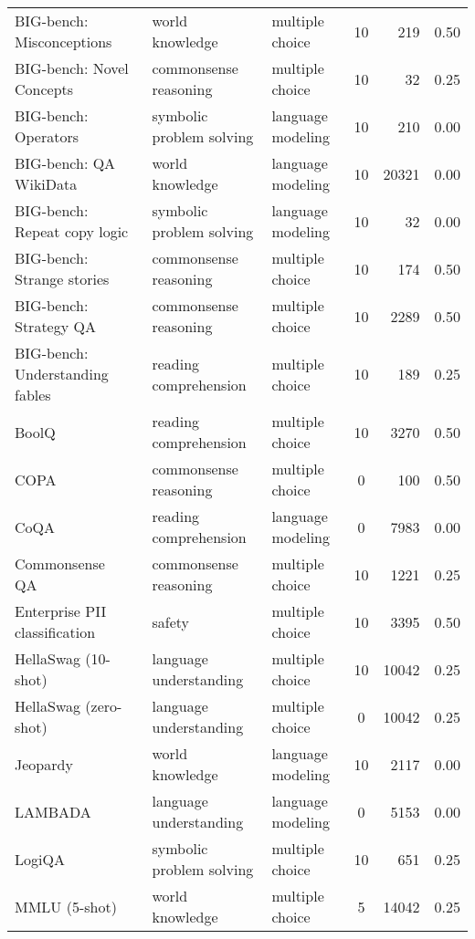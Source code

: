 \begin{table}[t!]
\begin{tabular}{lllcrc}
BIG-bench: Misconceptions~\cite{srivastava2023beyond} & world knowledge & multiple choice & 10 & 219 & 0.50\\
BIG-bench: Novel Concepts~\cite{srivastava2023beyond} & commonsense reasoning & multiple choice & 10 & 32 & 0.25\\
BIG-bench: Operators~\cite{srivastava2023beyond} & symbolic problem solving & language modeling & 10 & 210 & 0.00\\
BIG-bench: QA WikiData~\cite{srivastava2023beyond} & world knowledge & language modeling & 10 & 20321 & 0.00\\
BIG-bench: Repeat copy logic~\cite{srivastava2023beyond} & symbolic problem solving & language modeling & 10 & 32 & 0.00\\
BIG-bench: Strange stories~\cite{srivastava2023beyond} & commonsense reasoning & multiple choice & 10 & 174 & 0.50\\
BIG-bench: Strategy QA~\cite{srivastava2023beyond} & commonsense reasoning & multiple choice & 10 & 2289 & 0.50\\
BIG-bench: Understanding fables~\cite{srivastava2023beyond} & reading comprehension & multiple choice & 10 & 189 & 0.25\\
BoolQ~\cite{boolq} & reading comprehension & multiple choice & 10 & 3270 & 0.50\\
COPA~\cite{copa} & commonsense reasoning & multiple choice & 0 & 100 & 0.50\\
CoQA~\cite{reddy-etal-2019-coqa} & reading comprehension & language modeling & 0 & 7983 & 0.00\\
Commonsense QA~\cite{talmor-etal-2019-commonsenseqa} & commonsense reasoning & multiple choice & 10 & 1221 & 0.25\\
Enterprise PII classification~\cite{pii} & safety & multiple choice & 10 & 3395 & 0.50\\
HellaSwag (10-shot)~\cite{hellaswag} & language understanding & multiple choice & 10 & 10042 & 0.25\\
HellaSwag (zero-shot)~\cite{hellaswag} & language understanding & multiple choice & 0 & 10042 & 0.25\\
Jeopardy~\cite{mosaicml} & world knowledge & language modeling & 10 & 2117 & 0.00\\
LAMBADA~\cite{lambada} & language understanding & language modeling & 0 & 5153 & 0.00\\
LogiQA~\cite{Liu2020LogiQAAC} & symbolic problem solving & multiple choice & 10 & 651 & 0.25\\
MMLU (5-shot)~\cite{mmlu} & world knowledge & multiple choice & 5 & 14042 & 0.25\\

\end{tabular}
\end{table}
